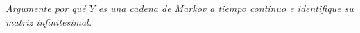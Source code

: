 \emph{
    Argumente por qu\'e $Y$ es una cadena de Markov a tiempo continuo e identifique su 
    matriz infinitesimal.\pn
}
\afterstatement\pn